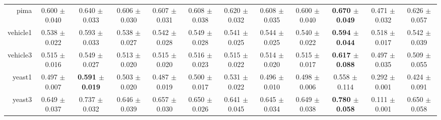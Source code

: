 \begin{table}[!ht]
{\begin{tabular}{r c c c c c c c c c c c}
pima & 0.600 $\pm$ 0.040 & 0.640 $\pm$ 0.033 & 0.606 $\pm$ 0.030 & 0.607 $\pm$ 0.031 & 0.608 $\pm$ 0.038 & 0.620 $\pm$ 0.032 & 0.608 $\pm$ 0.035 & 0.600 $\pm$ 0.040 & \textbf{0.670 $\pm$ 0.049} & 0.471 $\pm$ 0.032 & 0.626 $\pm$ 0.057 \\
vehicle1 & 0.538 $\pm$ 0.022 & 0.593 $\pm$ 0.033 & 0.538 $\pm$ 0.027 & 0.542 $\pm$ 0.028 & 0.549 $\pm$ 0.028 & 0.541 $\pm$ 0.025 & 0.544 $\pm$ 0.025 & 0.540 $\pm$ 0.022 & \textbf{0.594 $\pm$ 0.044} & 0.518 $\pm$ 0.017 & 0.542 $\pm$ 0.039 \\
vehicle3 & 0.515 $\pm$ 0.016 & 0.549 $\pm$ 0.027 & 0.513 $\pm$ 0.020 & 0.515 $\pm$ 0.020 & 0.516 $\pm$ 0.023 & 0.515 $\pm$ 0.022 & 0.514 $\pm$ 0.020 & 0.515 $\pm$ 0.017 & \textbf{0.617 $\pm$ 0.088} & 0.497 $\pm$ 0.035 & 0.509 $\pm$ 0.055 \\
yeast1 & 0.497 $\pm$ 0.007 & \textbf{0.591 $\pm$ 0.019} & 0.503 $\pm$ 0.020 & 0.487 $\pm$ 0.019 & 0.500 $\pm$ 0.017 & 0.531 $\pm$ 0.022 & 0.496 $\pm$ 0.010 & 0.498 $\pm$ 0.006 & 0.558 $\pm$ 0.114 & 0.292 $\pm$ 0.001 & 0.424 $\pm$ 0.091 \\
yeast3 & 0.649 $\pm$ 0.037 & 0.737 $\pm$ 0.032 & 0.646 $\pm$ 0.039 & 0.657 $\pm$ 0.030 & 0.650 $\pm$ 0.026 & 0.641 $\pm$ 0.045 & 0.645 $\pm$ 0.034 & 0.649 $\pm$ 0.038 & \textbf{0.780 $\pm$ 0.058} & 0.111 $\pm$ 0.001 & 0.650 $\pm$ 0.058 \\
\end{tabular}}
\end{table}
